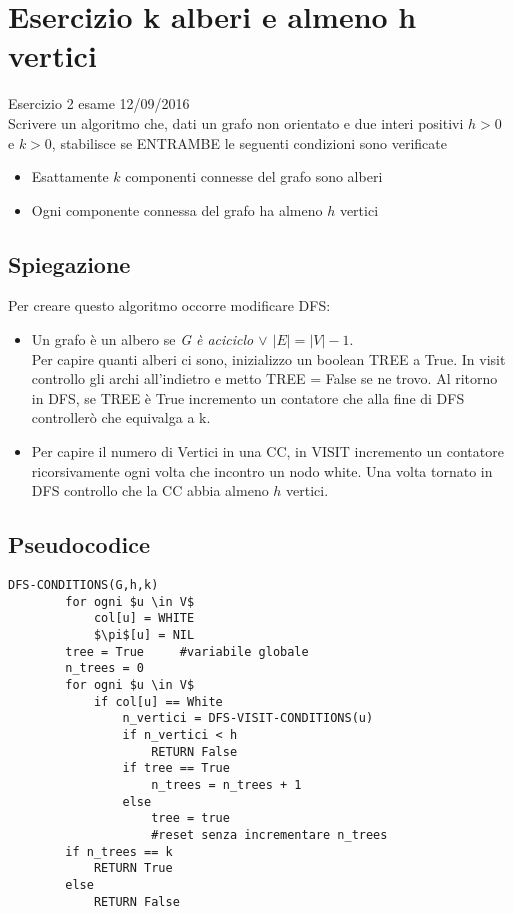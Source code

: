 \documentclass[12pt, a4paper, openany]{book}
\begin{document}
\section{Esercizio k alberi e almeno h vertici} Esercizio 2 esame 12/09/2016\\
Scrivere un algoritmo che, dati un grafo non orientato e due interi positivi $h>0$ e $k>0$, stabilisce se ENTRAMBE le seguenti condizioni sono verificate
\begin{itemize}
	\item Esattamente $k$ componenti connesse del grafo sono alberi
	\item Ogni componente connessa del grafo ha almeno $h$ vertici
\end{itemize}

\subsection*{Spiegazione}
Per creare questo algoritmo occorre modificare DFS:
\begin{itemize}
	\item Un grafo è un albero se \emph{G è aciciclo $\vee$ $|E| = |V| - 1$}.
		\\Per capire quanti alberi ci sono, inizializzo un boolean TREE a True. In visit controllo gli archi all'indietro e metto TREE = False se ne trovo. Al ritorno in DFS, se TREE è True incremento un contatore che alla fine di DFS controllerò che equivalga a k.
	\item Per capire il numero di Vertici in una CC, in VISIT incremento un contatore ricorsivamente ogni volta che incontro un nodo white. Una volta tornato in DFS controllo che la CC abbia almeno $h$ vertici.
\end{itemize}

\subsection*{Pseudocodice}
\begin{lstlisting}[mathescape=true]
    DFS-CONDITIONS(G,h,k)
        for ogni $u \in V$
            col[u] = WHITE
            $\pi$[u] = NIL
        tree = True     #variabile globale
        n_trees = 0
        for ogni $u \in V$
            if col[u] == White
                n_vertici = DFS-VISIT-CONDITIONS(u)
                if n_vertici < h
                    RETURN False
                if tree == True
                    n_trees = n_trees + 1
                else
                    tree = true
					#reset senza incrementare n_trees
        if n_trees == k
            RETURN True
        else
            RETURN False
\end{lstlisting}
\end{document}
